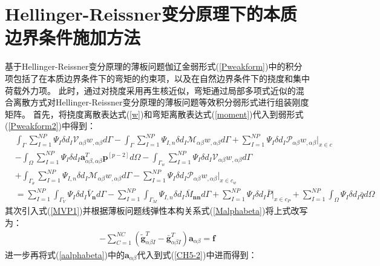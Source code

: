 \section{Hellinger-Reissner变分原理下的本质边界条件施加方法}
基于Hellinger-Reissner变分原理的薄板问题伽辽金弱形式(\ref{Pweakform})中的积分项包括了在本质边界条件下的弯矩的约束项，以及在自然边界条件下的挠度和集中荷载外力项。
此时，通过对挠度采用再生核近似，弯矩通过局部多项式近似的混合离散方式对Hellinger-Reissner变分原理的薄板问题等效积分弱形式进行组装刚度矩阵。
首先，将挠度离散表达式(\ref{w})和弯矩离散表达式(\ref{moment})代入到弱形式(\ref{Pweakform2})中得到：
\begin{equation}\label{CH5-1}
\begin{split}
    &\int_{\Gamma}\sum_{I=1}^{N\!P}\Psi_I\delta{d_I}\mathcal{V}_{\alpha\beta}w_{,\alpha\beta}d\Gamma-\int_{\Gamma}\sum_{I=1}^{N\!P}\Psi_{I,n}\delta{d_I}\mathcal{M}_{\alpha\beta}w_{,\alpha\beta}d\Gamma+\sum_{I=1}^{N\!P}\Psi_I\delta{d_I}\mathcal{P}_{\alpha\beta}w_{,\alpha\beta}\vert_{x\in c}\\
    &-\int_{\Omega}\sum_{I=1}^{N\!P}\Psi_I\delta{d_I}\pmb{a}^T_{\alpha\beta,\alpha\beta}\pmb{p}^{[p-2]}d\Omega-\int_{\Gamma_w}\sum_{I=1}^{N\!P}\Psi_I\delta{d_I}\mathcal{V}_{\alpha\beta}w_{,\alpha\beta}d\Gamma\\
    &+\int_{\Gamma_{\theta}}\sum_{I=1}^{N\!P}\Psi_{I,n}\delta{d_I}\mathcal{M}_{\alpha\beta}w_{,\alpha\beta}d\Gamma
    -\sum_{I=1}^{N\!P}\Psi_I\delta{d_I}\mathcal{P}_{\alpha\beta}w_{,\alpha\beta}\vert_{x\in c_w}\\
    &=\sum_{I=1}^{N\!P}\int_{\Gamma_V}\Psi_I\delta{d_I}\bar{V}_{\pmb n}d\Gamma-\sum_{I=1}^{N\!P}\int_{\Gamma_M}\Psi_{I,n}\delta{d_I}\bar{M}_{\pmb{nn}}d\Gamma
    +\sum_{I=1}^{N\!P}\Psi_I\delta{d_I}\bar{P}\vert_{x\in{c_P}}+\sum_{I=1}^{N\!P}\int_{\Omega}\Psi_I\delta{d_I}\bar{q}d\Omega
\end{split}
\end{equation}
其次引入式(\ref{MVP1})并根据薄板问题线弹性本构关系式(\ref{Malphabeta})将上式改写为：
\begin{equation}\label{CH5-2}
\begin{split}
  -\sum_{C=1}^{N\!C}(\tilde{\pmb g}_{\alpha\beta I}^T-\bar{\pmb g}_{\alpha\beta I}^T)\pmb a_{\alpha\beta}=\pmb{f}
\end{split}
\end{equation}
进一步再将式(\ref{aalphabeta})中的$\pmb{a}_{\alpha\beta}$代入到式(\ref{CH5-2})中进而得到：
